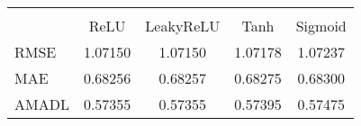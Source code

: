 \begin{tabular}{lcccc}
\hline\hline \\ [-1.8ex]
 & ReLU & LeakyReLU & Tanh & Sigmoid \\ 
 \hline 
RMSE & 1.07150 & 1.07150 & 1.07178 & 1.07237 \\ 
MAE & 0.68256 & 0.68257 & 0.68275 & 0.68300 \\ 
AMADL & 0.57355 & 0.57355 & 0.57395 & 0.57475 \\ 
\hline\hline
\end{tabular}